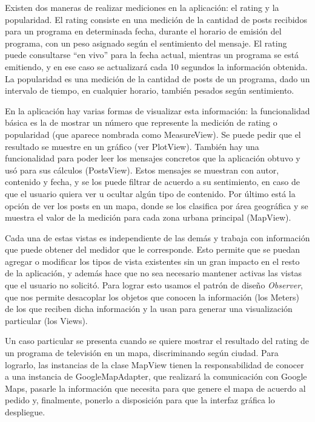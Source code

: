 Existen dos maneras de realizar mediciones en la aplicación: el rating y la popularidad. El rating consiste en una medición de la cantidad de posts recibidos para un programa en determinada fecha, durante el horario de emisión del programa, con un peso asignado según el sentimiento del mensaje. El rating puede consultarse ``en vivo'' para la fecha actual, mientras un programa se está emitiendo, y en ese caso se actualizará cada 10 segundos la información obtenida. La popularidad es una medición de la cantidad de posts de un programa, dado un intervalo de tiempo, en cualquier horario, también pesados según sentimiento.
\bigskip

En la aplicación hay varias formas de visualizar esta información: la funcionalidad básica es la de mostrar un número que represente la medición de rating o popularidad (que aparece nombrada como MeasureView). Se puede pedir que el resultado se muestre en un gráfico (ver PlotView). También hay una funcionalidad para poder leer los mensajes concretos que la aplicación obtuvo y usó para sus cálculos (PostsView). Estos mensajes se muestran con autor, contenido y fecha, y se los puede filtrar de acuerdo a su sentimiento, en caso de que el usuario quiera ver u ocultar algún tipo de contenido. Por último está la opción de ver los posts en un mapa, donde se los clasifica por área geográfica y se muestra el valor de la medición para cada zona urbana principal (MapView).
\bigskip

Cada una de estas vistas es independiente de las demás y trabaja con información que puede obtener del medidor que le corresponde. Esto permite que se puedan agregar o modificar los tipos de vista existentes sin un gran impacto en el resto de la aplicación, y además hace que no sea necesario mantener activas las vistas que el usuario no solicitó. Para lograr esto usamos el patrón de diseño \textit{Observer}, que nos permite desacoplar los objetos que conocen la información (los Meters) de los que reciben dicha información y la usan para generar una visualización particular (los Views).
\bigskip

Un caso particular se presenta cuando se quiere mostrar el resultado del rating de un programa de televisión en un mapa, discriminando según ciudad. Para lograrlo, las instancias de la clase MapView tienen la responsabilidad de conocer a una instancia de GoogleMapAdapter, que realizará la comunicación con Google Maps, pasarle la información que necesita para que genere el mapa de acuerdo al pedido y, finalmente, ponerlo a disposición para que la interfaz gráfica lo despliegue.  

